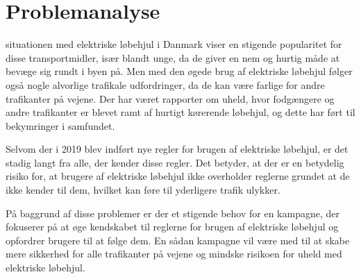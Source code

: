 \chapter{Problemanalyse}
situationen med elektriske løbehjul i Danmark viser en stigende popularitet for disse 
transportmidler, især blandt unge, da de giver en nem og hurtig måde at bevæge sig 
rundt i byen på. Men med den øgede brug af elektriske løbehjul følger også nogle 
alvorlige trafikale udfordringer, da de kan være farlige for andre trafikanter på vejene. 
Der har været rapporter om uheld, hvor fodgængere og andre trafikanter er blevet ramt 
af hurtigt kørerende løbehjul, og dette har ført til bekymringer i samfundet.

Selvom der i 2019 blev indført nye regler for brugen af elektriske løbehjul, 
er det stadig langt fra alle, der kender disse regler. Det betyder, 
at der er en betydelig risiko for, at brugere af elektriske løbehjul ikke overholder 
reglerne grundet at de ikke kender til dem, hvilket kan føre til yderligere trafik 
ulykker.

På baggrund af disse problemer er der et stigende behov for en kampagne, 
der fokuserer på at øge kendskabet til reglerne for brugen af elektriske løbehjul og 
opfordrer brugere til at følge dem. En sådan kampagne vil være med til at skabe mere 
sikkerhed for alle trafikanter på vejene og mindske risikoen for uheld med elektriske 
løbehjul.